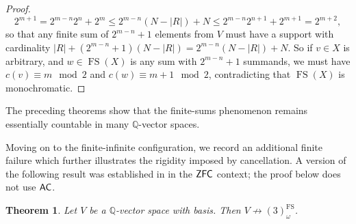 \documentclass[10pt,a4paper]{amsart}
\newtheorem{theorem}{Theorem}[section]
\theoremstyle{definition}
\newcommand{\ac}{\mathnormal{\mathsf{AC}}}
\newcommand{\zfc}{\mathnormal{\mathsf{ZFC}}}
\theoremstyle{remark}
\numberwithin{equation}{section}
\begin{document}
\begin{proof}
        \begin{equation*} 
        2^{m+1}= 
        2^{m-n}2^{n}+2^{m}\leq 
        2^{m-n}(N-|R|)+N\leq 
        2^{m-n}2^{n+1}+2^{m+1}= 
        2^{m+2},
        \end{equation*}
        so that any finite sum of $2^{m-n}+1$ elements from $V$ must have a support with cardinality $|R|+(2^{m-n}+1)(N-|R|)=2^{m-n}(N-|R|)+N$. So if $v\in X$ is arbitrary, and $w\in\operatorname{FS}(X)$ is any sum with $2^{m-n}+1$ summands, we must have $c(v)\equiv m\mod 2$ and $c(w) \equiv m+1\mod2$, contradicting that $\operatorname{FS}(X)$ is monochromatic.
    \end{proof}

The preceding theorems show that the finite-sums phenomenon remains essentially countable in many $\mathbb{Q}$-vector spaces.

Moving on to the finite-infinite configuration, we record an additional finite failure which further illustrates the rigidity imposed by cancellation. A version of the following result was established in \cite[Theorem 5]{FernandezLee2020} in the $\zfc$ context; the proof below does not use $\ac$.

\begin{theorem}\label{thm:hindman-three-colors-fails}
Let $V$ be a $\mathbb{Q}$-vector space with basis. 
Then $V\not\to(3)^{\operatorname{FS}}_{\omega}$.
\end{theorem}
\end{document}
